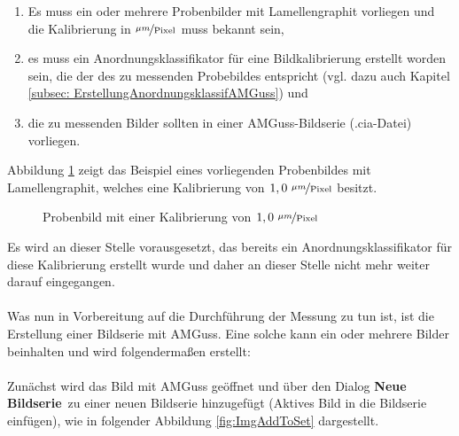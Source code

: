 \documentclass[
fontsize=10pt, 
listof = totoc,
parskip = half	
]{report}
\begin{document}
\begin{enumerate}
	\item Es muss ein oder mehrere Probenbilder mit Lamellengraphit vorliegen und die Kalibrierung in $\nicefrac{\mu m}{\text{Pixel}}$ muss bekannt sein, 
	\item es muss ein Anordnungsklassifikator für eine Bildkalibrierung erstellt worden sein, die der des zu messenden Probebildes entspricht (vgl. dazu auch Kapitel \ref{subsec: ErstellungAnordnungsklassifAMGuss}) und
	\item die zu messenden Bilder sollten in einer AMGuss-Bildserie (.cia-Datei) vorliegen.	
\end{enumerate}

\noindent Abbildung \ref{fig:ImgCalib10} zeigt das Beispiel eines vorliegenden Probenbildes mit Lamellengraphit, welches eine Kalibrierung von $1,0~\nicefrac{\mu m}{\text{Pixel}}$ besitzt.

\begin{figure}[H]
	\centering
	\caption{Probenbild mit einer Kalibrierung von $1,0~\nicefrac{\mu m}{\text{Pixel}}$}
	\label{fig:ImgCalib10}
\end{figure}

\noindent Es wird an dieser Stelle vorausgesetzt, das bereits ein Anordnungsklassifikator für diese Kalibrierung erstellt wurde und daher an dieser Stelle nicht mehr weiter darauf eingegangen.
\\\\
\noindent Was nun in Vorbereitung auf die Durchführung der Messung zu tun ist, ist die Erstellung einer Bildserie mit AMGuss. Eine solche kann ein oder mehrere Bilder beinhalten und wird folgendermaßen erstellt:
\\\\
\noindent Zunächst wird das Bild mit AMGuss geöffnet und über den Dialog \textbf{\glqq Neue Bildserie\grqq}~zu einer neuen Bildserie hinzugefügt (Aktives Bild in die Bildserie einfügen), wie in folgender Abbildung \ref{fig:ImgAddToSet} dargestellt.
\end{document}
